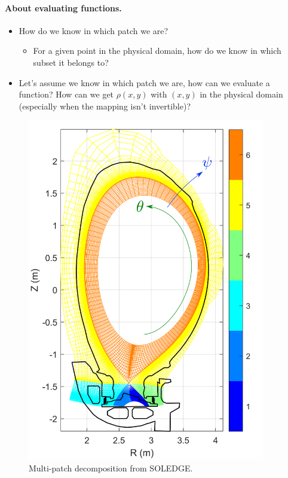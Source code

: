 \documentclass[presentation.tex]{subfiles}
\begin{document}
\paragraph{About evaluating functions.}
\begin{itemize}
	\item How do we know in which patch we are?
	\begin{itemize}
		\item For a given point in the physical domain, how do we know in which subset it belongs to?
	\end{itemize}
	\item Let's assume we know in which patch we are, how can we evaluate a function? How can we get $\rho(x,y)$ with $(x,y)$ in the physical domain (especially when the mapping isn't invertible)?
\end{itemize}





\begin{figure}[!h]
\centering
	\includegraphics[height=15cm]{images/JET_zones2_SOLEDGE.png}
\caption{Multi-patch decomposition from SOLEDGE.}
\end{figure}

\newpage
\end{document}
